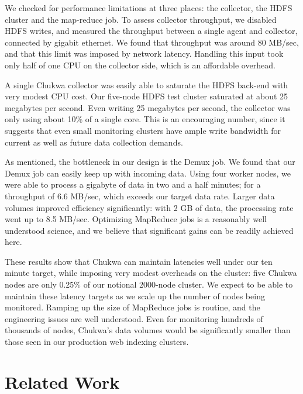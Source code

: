 \documentclass[letterpaper,twocolumn,10pt]{article}
\begin{document}
We checked for performance limitations at three places: the collector, the HDFS cluster and the map-reduce job.
To assess collector throughput, we disabled HDFS writes, and measured the throughput between a single agent and collector, connected by gigabit ethernet.  We found that throughput was around 80 MB/sec, and that this limit was imposed by network latency.  Handling this input took only half of one CPU on the collector side, which is an affordable overhead. 

A single Chukwa collector was easily able to saturate the HDFS back-end with very modest CPU cost. Our five-node HDFS test cluster saturated at about 25 megabytes per second.  Even writing 25 megabytes per second, the collector was only using about 10\% of a single core. This is an encouraging number, since it suggests that even small monitoring clusters have ample write bandwidth for current as well as future data collection demands.  


As mentioned, the bottleneck in our design is the Demux job. We found that our Demux job can easily keep up with incoming data.  Using four worker nodes, we were able to process a gigabyte of data in two and a half minutes; for a throughput of 6.6 MB/sec, which exceeds our target data rate. Larger data volumes improved efficiency significantly:  with 2 GB of data, the processing rate went up to 8.5 MB/sec. Optimizing MapReduce jobs is a reasonably well understood science, and we believe that significant gains can be readily achieved here. 

These results show that Chukwa can maintain latencies well under our ten minute target, while imposing very modest overheads on the cluster: five Chukwa nodes are only 0.25\% of our notional 2000-node cluster. We expect to be able to maintain these latency targets as we scale up the number of nodes being monitored.  Ramping up the size of MapReduce jobs is routine, and the engineering issues are well understood. Even for monitoring hundreds of thousands of nodes, Chukwa's data volumes would be significantly smaller than those seen in our production web indexing clusters.


\section{Related Work}
\end{document}
